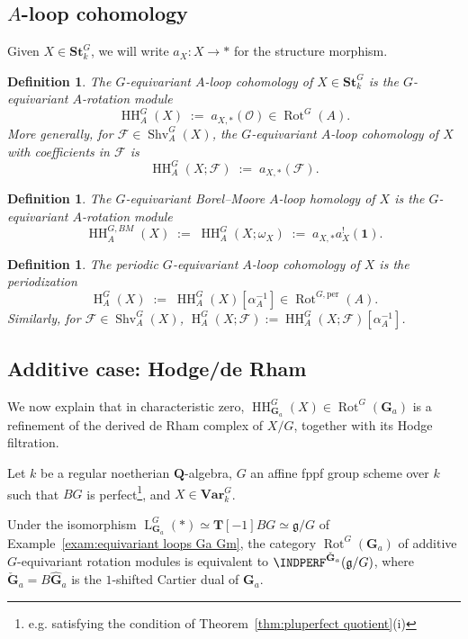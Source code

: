 \documentclass[12pt, oneside]{amsart}
\numberwithin{equation}{section}
\newtheorem{definition}[subsubsection]{Definition}
\theoremstyle{remark}
\theoremstyle{plain}
\newcommand{\Loop}{\operatorname{L}}
\newcommand{\OO}{\mathcal{O}}
\newcommand{\GG}{\mathbf{G}}
\newcommand{\GGa}{\mathbf{G}_{a}}
\newcommand{\bQ}{\mathbf{Q}}
\newcommand{\Stk}{\mathbf{St}_{k}}
\newcommand{\Var}{\mathbf{Var}_{k}}
\newcommand{\TT}{\mathbf{T}}
\newcommand{\HH}{\operatorname{HH}}
\newcommand{\Hcoh}{\operatorname{H}}
\newcommand{\Shv}{\operatorname{Shv}}
\newcommand{\Rot}{\operatorname{Rot}}
\newcommand{\un}{\mathbf{1}}
\newcommand{\cF}{\mathcal{F}}
\begin{document}
\subsection{$A$-loop cohomology}

Given $X \in \Stk^G$, we will write $a_X : X \to *$ for the structure morphism.

\begin{definition}\label{def:HH_A^G}
The \emph{$G$-equivariant $A$-loop cohomology} of $X \in \Stk^G$ is the $G$-equivariant $A$-rotation module
\[
  \HH^G_A(X) \;:=\; a_{X,*}(\OO) \in \Rot^G(A).
\]
More generally, for $\cF \in \Shv_A^G(X)$, the \emph{$G$-equivariant $A$-loop cohomology of $X$ with coefficients in $\cF$} is
\[
  \HH_A^G(X; \cF) \;:=\; a_{X,*}(\cF).
\]
\end{definition}

\begin{definition}\label{def:BM homology}
The \emph{$G$-equivariant Borel--Moore $A$-loop homology of $X$} is the $G$-equivariant $A$-rotation module
\[
  \HH_A^{G,BM}(X) \;:=\; \HH_A^G(X; \omega_{X}) \;:=\; a_{X,*} a_X^! (\un).
\]
\end{definition}

\begin{definition}\label{def:H_A^G} The \emph{periodic $G$-equivariant $A$-loop cohomology of $X$} is the periodization $$\Hcoh_A^G(X) \;:=\; \HH_A^G(X)[\alpha_A^{-1}] \in \Rot^{G,\mathrm{per}}(A).$$
Similarly, for $\cF \in \Shv_A^G(X)$, $\Hcoh_A^G(X; \cF) := \HH_A^G(X; \cF)[\alpha_A^{-1}]$.
\end{definition}

\subsection{Additive case: Hodge/de Rham}\label{ssec:dR comparison}

We now explain that in characteristic zero, $\HH_{\GGa}^G(X) \in \Rot^G(\GGa)$ is a refinement of the derived de Rham complex of $X/G$, together with its Hodge filtration.

Let $k$ be a regular noetherian $\bQ$-algebra, $G$ an affine fppf group scheme over $k$ such that $BG$ is perfect\footnote{%
  e.g. satisfying the condition of Theorem~\ref{thm:pluperfect quotient}(i)
}, and $X \in \Var^G$.

Under the isomorphism $\Loop_{\GGa}^G(*) \simeq \TT[-1]BG \simeq \mathfrak{g}/G$ of Example~\ref{exam:equivariant loops Ga Gm}, the category $\Rot^G(\GGa)$ of additive $G$-equivariant rotation modules is equivalent to $\INDPERF^{\check{\GG}_a}(\mathfrak{g}/G)$, where $\check{\GG}_a = B\widehat{\GG}_a$ is the $1$-shifted Cartier dual of $\GGa$.
\end{document}
